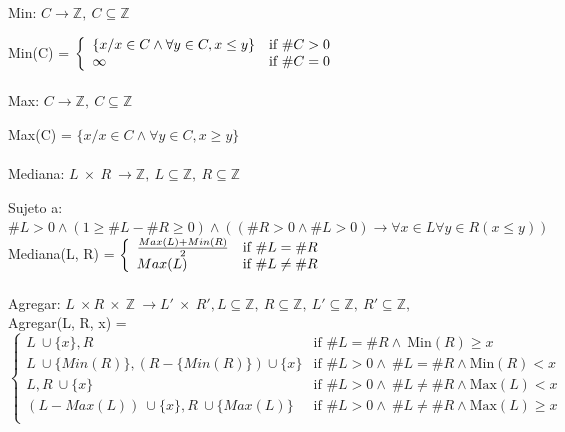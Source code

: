\documentclass{article}
\theoremstyle{definition}
\theoremstyle{remark}
\begin{document}
\newcommand{\fourpartdef}[8]
{
	\left\{
		\begin{array}{ll}
			#1 & \mbox{if } #2 \\
			#3 & \mbox{if } #4 \\
			#5 & \mbox{if } #6 \\
			#7 & \mbox{if } #8 \\
		\end{array}
	\right.
}

    Min: $C \rightarrow \mathds{Z} , \  C \subseteq \mathds{Z} $  
    
    Min(C) = $\left\{ \begin{array}{ll}  \{x / x \in C  \wedge \forall y \in C, x \leq y\}  & \mbox{if } \#C > 0 \\ \infty & \mbox{if } \#C = 0 \\ \end{array} \right.$ \\ \\

    Max: $C \rightarrow \mathds{Z} , \  C \subseteq \mathds{Z} $ 
    
    Max(C) = $\{x / x \in C  \wedge \forall y \in C, x \geq y\}$ \\ \\

    Mediana: $L \  \times\  R \  \rightarrow \mathds{Z}, \ L \subseteq \mathds{Z}, \ R \subseteq \mathds{Z}$
    
    Sujeto a:  $\#L > 0  \wedge  (1 \geq \#L - \#R \geq 0) \wedge ((\#R > 0 \wedge \#L > 0) \rightarrow \forall x \in L \forall y \in R (x \leq y) )$ \\ 
    
    Mediana(L, R) = $\left\{ \begin{array}{ll}  \frac{Max(L) + Min(R)}{2}  & \mbox{if } \#L = \#R \\ Max(L) & \mbox{if } \#L \neq \#R \\ \end{array} \right.$\\ \\

    
    
    Agregar: $L\ \times R\ \times\ \mathds{Z}\ \rightarrow L'\  \times\  R', L \subseteq \mathds{Z}, \ R \subseteq \mathds{Z}, \ L' \subseteq \mathds{Z}, \ R' \subseteq \mathds{Z}, \ $\\
    
    Agregar(L, R, x) = $\fourpartdef { L  \ \cup \{x\}, R} 
                                    {\#L = \#R   \wedge \ \text{Min}(R) \geq x} 
                                    { L  \ \cup \{Min(R)\}, (R - \{Min(R)\}) \cup \{x\}}
                                    { \#L > 0  \wedge \ \#L = \#R \wedge \text{Min}(R) < x}
                                    {L, R \ \cup \{x\}}
                                    {\#L > 0  \wedge \ \#L \neq \#R \wedge \text{Max}(L) < x}
                                    {(L - Max(L)) \ \cup \{x\}, R \ \cup \{Max(L)\} }
                                    {\#L > 0  \wedge \ \#L \neq \#R \wedge \text{Max}(L) \geq x}$\\
      \\
          
\end{document}
